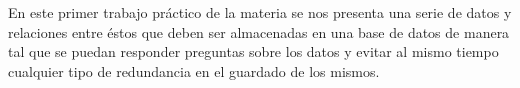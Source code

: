 En este primer trabajo pr\'actico de la materia se nos presenta una serie
de datos y relaciones entre \'estos que deben ser almacenadas en una base de datos
de manera tal que se puedan responder preguntas sobre los datos y evitar al
mismo tiempo cualquier tipo de redundancia en el guardado de los mismos.
